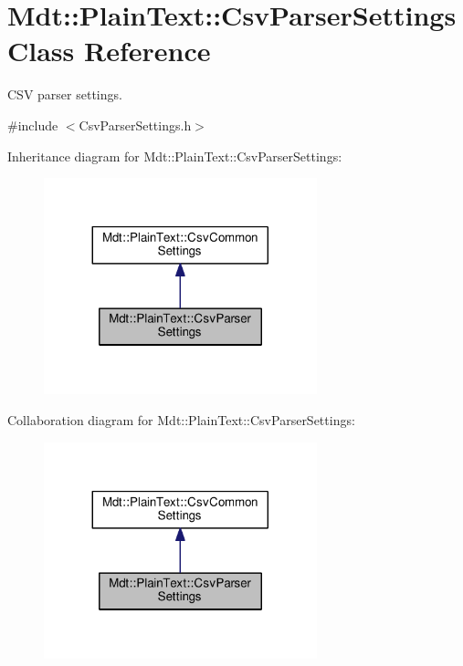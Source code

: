 \hypertarget{class_mdt_1_1_plain_text_1_1_csv_parser_settings}{}\section{Mdt\+:\+:Plain\+Text\+:\+:Csv\+Parser\+Settings Class Reference}
\label{class_mdt_1_1_plain_text_1_1_csv_parser_settings}


C\+SV parser settings.  




{\ttfamily \#include $<$Csv\+Parser\+Settings.\+h$>$}



Inheritance diagram for Mdt\+:\+:Plain\+Text\+:\+:Csv\+Parser\+Settings\+:
\nopagebreak
\begin{figure}[H]
\begin{center}
\leavevmode
\includegraphics[width=224pt]{class_mdt_1_1_plain_text_1_1_csv_parser_settings__inherit__graph}
\end{center}
\end{figure}


Collaboration diagram for Mdt\+:\+:Plain\+Text\+:\+:Csv\+Parser\+Settings\+:
\nopagebreak
\begin{figure}[H]
\begin{center}
\leavevmode
\includegraphics[width=224pt]{class_mdt_1_1_plain_text_1_1_csv_parser_settings__coll__graph}
\end{center}
\end{figure}
